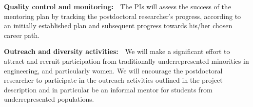   \vspace{+2mm}
{\bf Quality control and monitoring:}~~The PIs will assess the success
  of the mentoring plan by tracking the postdoctoral researcher's
  progress, according to an initially established plan and subsequent
  progress towards his/her chosen career path.
  
  
\vspace{+2mm}
{\bf Outreach and diversity activities:}~~We will make a
  significant effort to attract and recruit participation from
  traditionally underrepresented minorities in engineering, and
  particularly women. We will encourage the postdoctoral researcher 
  to participate in the outreach activities outlined in the project description
  and in particular be an informal mentor for students from underrepresented populations. 